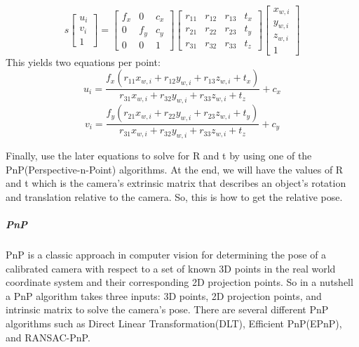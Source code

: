 \begin{equation}
	s
	\begin{bmatrix}
		u_i\\v_i\\1
	\end{bmatrix}
	=
	\begin{bmatrix}
		f_x & 0 & c_x\\
		0 & f_y & c_y\\
		0 & 0 & 1
	\end{bmatrix}
	\begin{bmatrix}
		r_{11} & r_{12} & r_{13} & t_{x}\\
		r_{21} & r_{22} & r_{23} & t_{y}\\
		r_{31} & r_{32} & r_{33} & t_{z}
	\end{bmatrix}
	\begin{bmatrix}
		x_{w,i}\\y_{w,i}\\z_{w,i}\\1
	\end{bmatrix}
\nonumber\end{equation}
This yields two equations per point:
\begin{equation}
	u_i = \frac{f_x(r_{11}x_{w,i} + r_{12}y_{w,i} + r_{13}z_{w,i} + t_{x})}{r_{31}x_{w,i} + r_{32}y_{w,i} + r_{33}z_{w,i} + t_{z}} + c_x
\nonumber\end{equation}
\begin{equation}
	v_i = \frac{f_y(r_{21}x_{w,i} + r_{22}y_{w,i} + r_{23}z_{w,i} + t_{y})}{r_{31}x_{w,i} + r_{32}y_{w,i} + r_{33}z_{w,i} + t_{z}} + c_y
\nonumber\end{equation}

Finally, use the later equations to solve for R and t by using one of the PnP(Perspective-n-Point) algorithms. At the end, we will have the values of R and t which is the camera's extrinsic matrix that describes an object's rotation and translation relative to the camera. So, this is how to get the relative pose.

\subparagraph{PnP}
PnP is a classic approach in computer vision for determining the pose of a calibrated camera with respect to a set of known 3D points in the real world coordinate system and their corresponding 2D projection points. So in a nutshell a PnP algorithm takes three inputs: 3D points, 2D projection points, and intrinsic matrix to solve the camera's pose. There are several different PnP algorithms such as Direct Linear Transformation(DLT), Efficient PnP(EPnP), and RANSAC-PnP. 


